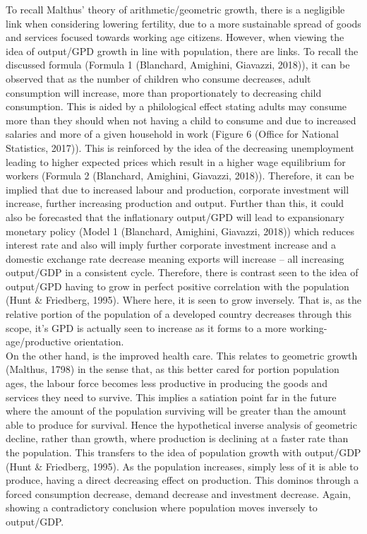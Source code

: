 \documentclass[11pt, english]{article}
\begin{document}
	To recall Malthus' theory of arithmetic/geometric growth, there is a negligible link when considering lowering fertility, due to a more sustainable spread of goods and services focused towards working age citizens. However, when viewing the idea of output/GPD growth in line with population, there are links. To recall the discussed formula (Formula 1 (Blanchard, Amighini, Giavazzi, 2018)), it can be observed that as the number of children who consume decreases, adult consumption will increase, more than proportionately to decreasing child consumption. This is aided by a philological effect stating adults may consume more than they should when not having a child to consume and due to increased salaries and more of a given household in work (Figure 6 (Office for National Statistics, 2017)). This is reinforced by the idea of the decreasing unemployment leading to higher expected prices which result in a higher wage equilibrium for workers (Formula 2 (Blanchard, Amighini, Giavazzi, 2018)). Therefore, it can be implied that due to increased labour and production, corporate investment will increase, further increasing production and output. Further than this, it could also be forecasted that the inflationary output/GPD will lead to expansionary monetary policy (Model 1 (Blanchard, Amighini, Giavazzi, 2018)) which reduces interest rate and also will imply further corporate investment increase and a domestic exchange rate decrease meaning exports will increase – all increasing output/GDP in a consistent cycle. Therefore, there is contrast seen to the idea of output/GPD having to grow in perfect positive correlation with the population (Hunt \& Friedberg, 1995). Where here, it is seen to grow inversely. That is, as the relative portion of the population of a developed country decreases through this scope, it's GPD is actually seen to increase as it forms to a more working-age/productive orientation.\\

	On the other hand, is the improved health care. This relates to geometric growth (Malthus, 1798) in the sense that, as this better cared for portion population ages, the labour force becomes less productive in producing the goods and services they need to survive. This implies a satiation point far in the future where the amount of the population surviving will be greater than the amount able to produce for survival. Hence the hypothetical inverse analysis of geometric decline, rather than growth, where production is declining at a faster rate than the population. This transfers to the idea of population growth with output/GDP (Hunt \& Friedberg, 1995). As the population increases, simply less of it is able to produce, having a direct decreasing effect on production. This dominos through a forced consumption decrease, demand decrease and investment decrease. Again, showing a contradictory conclusion where population moves inversely to output/GDP.\\
\end{document}
